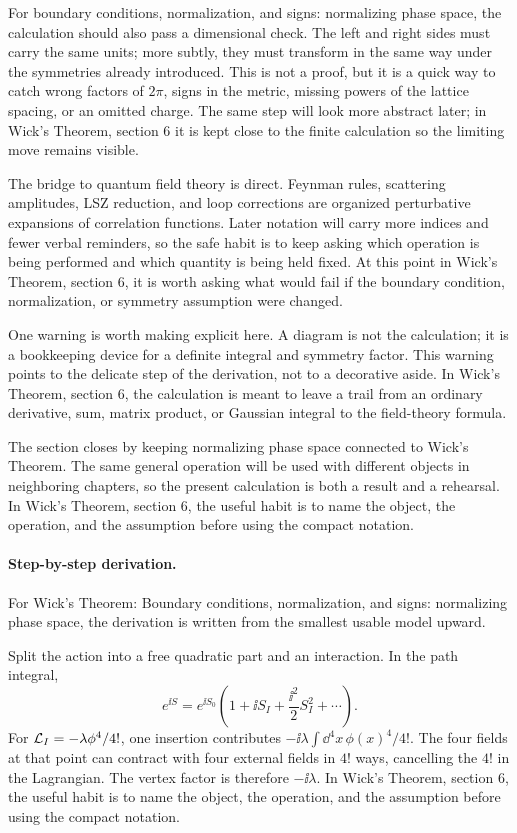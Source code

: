 For boundary conditions, normalization, and signs: normalizing phase space, the calculation should also pass a dimensional check.  The left and right sides must carry the same units; more subtly, they must transform in the same way under the symmetries already introduced.  This is not a proof, but it is a quick way to catch wrong factors of \(2\pi\), signs in the metric, missing powers of the lattice spacing, or an omitted charge.  The same step will look more abstract later; in Wick's Theorem, section 6 it is kept close to the finite calculation so the limiting move remains visible.

The bridge to quantum field theory is direct.  Feynman rules, scattering amplitudes, LSZ reduction, and loop corrections are organized perturbative expansions of correlation functions.  Later notation will carry more indices and fewer verbal reminders, so the safe habit is to keep asking which operation is being performed and which quantity is being held fixed.  At this point in Wick's Theorem, section 6, it is worth asking what would fail if the boundary condition, normalization, or symmetry assumption were changed.

One warning is worth making explicit here.  A diagram is not the calculation; it is a bookkeeping device for a definite integral and symmetry factor.  This warning points to the delicate step of the derivation, not to a decorative aside.  In Wick's Theorem, section 6, the calculation is meant to leave a trail from an ordinary derivative, sum, matrix product, or Gaussian integral to the field-theory formula.

The section closes by keeping normalizing phase space connected to Wick's Theorem.  The same general operation will be used with different objects in neighboring chapters, so the present calculation is both a result and a rehearsal.  In Wick's Theorem, section 6, the useful habit is to name the object, the operation, and the assumption before using the compact notation.



\paragraph{Step-by-step derivation.}

For Wick's Theorem: Boundary conditions, normalization, and signs: normalizing phase space, the derivation is written from the smallest usable model upward.

Split the action into a free quadratic part and an interaction.  In the path integral,
\[
  e^{\ii S}=e^{\ii S_0}\left(1+\ii S_I+\frac{\ii^2}{2}S_I^2+\cdots\right).
\]
For \(\mathcal L_I=-\lambda\phi^4/4!\), one insertion contributes \(-\ii\lambda\int\dd^4x\,\phi(x)^4/4!\).  The four fields at that point can contract with four external fields in \(4!\) ways, cancelling the \(4!\) in the Lagrangian.  The vertex factor is therefore \(-\ii\lambda\).  In Wick's Theorem, section 6, the useful habit is to name the object, the operation, and the assumption before using the compact notation.

